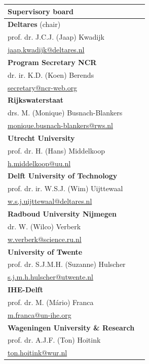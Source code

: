\begin{table}
\begin{tabular}[t]{ll}
		\end{tabular}
    \begin{tabular}[t]{ll}
        \textbf{Supervisory board}\\
        \hline
        \textbf{Deltares} (chair) \\
           prof. dr. J.C.J. (Jaap) Kwadijk \\ 
           \url{jaap.kwadijk@deltares.nl} \\
        \textbf{Program Secretary NCR} \\
            dr. ir. K.D. (Koen) Berends\\
            \url{secretary@ncr-web.org} \\
       \textbf{Rijkswaterstaat} \\
           drs. M. (Monique) Busnach-Blankers\\
           \url{monique.busnach-blankers@rws.nl} \\
       \textbf{Utrecht University} \\
            prof. dr. H. (Hans) Middelkoop \\ 
           \url{h.middelkoop@uu.nl} \\
       \textbf{Delft University of Technology} \\
            prof. dr. ir. W.S.J. (Wim) Uijttewaal \\ 
            \url{w.s.j.uijttewaal@deltares.nl} \\
       \textbf{Radboud University Nijmegen} \\
            dr. W. (Wilco) Verberk \\
            \url{w.verberk@science.ru.nl}\\
       \textbf{University of Twente} \\
            prof. dr. S.J.M.H. (Suzanne) Hulscher \\
            \url{s.j.m.h.hulscher@utwente.nl}\\
       \textbf{IHE-Delft} \\
            prof. dr. M. (M\'ario) Franca \\
            \url{m.franca@un-ihe.org}\\
        \textbf{Wageningen University \& Research}\\
            prof. dr. A.J.F. (Ton) Hoitink \\
            \url{ton.hoitink@wur.nl}\\

    \end{tabular}
	\end{table}



